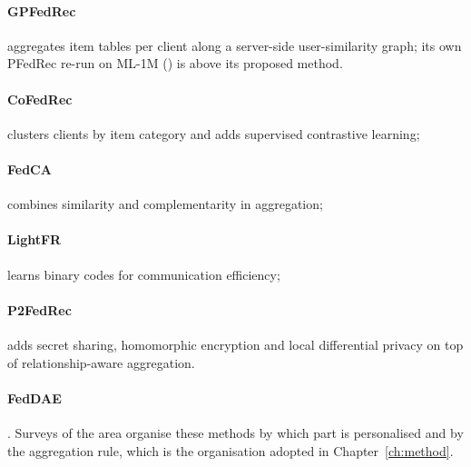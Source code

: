 \paragraph{GPFedRec} \cite{zhang2024gpfedrec} aggregates item tables per client along a
server-side user-similarity graph; its own PFedRec re-run on ML-1M () is above its proposed method. \paragraph{CoFedRec} \cite{he2024cofedrec} clusters
clients by item category and adds supervised contrastive learning; \paragraph{FedCA}
\cite{zhang2024fedca} combines similarity and complementarity in aggregation; \paragraph{LightFR}
\cite{zhang2022lightfr} learns binary codes for communication efficiency; \paragraph{P2FedRec}
\cite{hu2025p2fedrec} adds secret sharing, homomorphic encryption and local differential privacy
on top of relationship-aware aggregation. \paragraph{FedDAE} . Surveys of the area
\cite{zhang2025survey,yin2025devicers} organise these methods by which part is personalised
and by the aggregation rule, which is the organisation adopted in Chapter~\ref{ch:method}.

